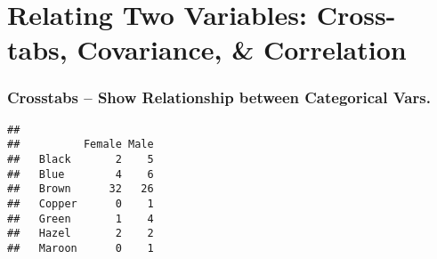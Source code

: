 \section{Relating Two Variables: Cross-tabs, Covariance, \& Correlation}
%
%
\begin{frame}[fragile]
\frametitle{Crosstabs -- Show Relationship between Categorical Vars.}

\small

\begin{knitrout}
\color{fgcolor}\begin{kframe}
\begin{alltt}
\hlopt{$}\hlopt{$}
\end{alltt}
\begin{verbatim}
##         
##          Female Male
##   Black       2    5
##   Blue        4    6
##   Brown      32   26
##   Copper      0    1
##   Green       1    4
##   Hazel       2    2
##   Maroon      0    1
\end{verbatim}
\end{kframe}
\end{knitrout}

\end{frame}
%
%
%
%
%
%
%

